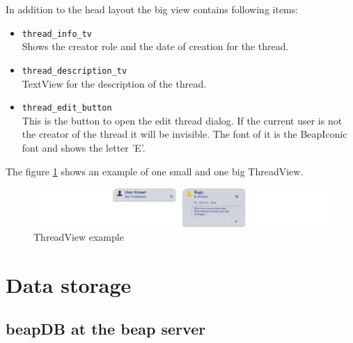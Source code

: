 \documentclass[12pt,a4paper,oneside]{report}
\newcommand{\beapDB}{beapDB}
\newcommand{\beapServer}{beap server}
\newcommand{\code}[1]{\lstinline{#1}}
\begin{document}
In addition to the head layout the big view contains following items:
\begin{itemize}
\item \code{thread_info_tv}\\
Shows the creator role and the date of creation for the thread.

\item \code{thread_description_tv}\\
TextView for the description of the thread.

\item \code{thread_edit_button}\\
This is the button to open the edit thread dialog. If the current user is not the creator of the thread it will be invisible. The font of it is the BeapIconic font and shows the letter 'E'.

\end{itemize}
The figure \ref{fig:ThreadViewEx} shows an example of one small and one big ThreadView.
\begin{figure}[!ht]
	\centering
    \includegraphics[width=\linewidth]{ThreadView.png}
	\caption{ThreadView example}
	\label{fig:ThreadViewEx}
\end{figure}

\section{Data storage}

\subsection{\beapDB{} at the \beapServer{}}
\end{document}
